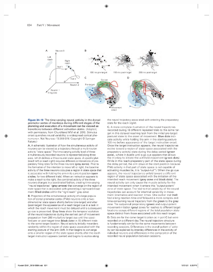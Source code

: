 \begin{figure}[htbp]
	\centering
	\includegraphics[width=0.8\linewidth]{chap34/fig_34_10}

\end{figure}
